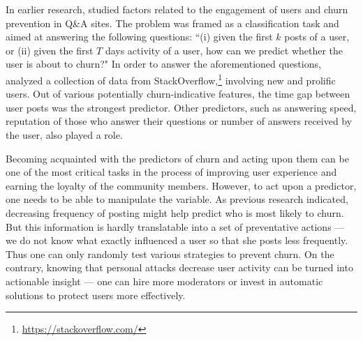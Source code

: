 \documentclass[a4paper,fleqn]{cas-dc}
\begin{document}
In earlier research, \citet{pudipeddi2014user} studied factors related to the engagement of users and churn prevention in Q\&A sites.
The problem was framed as a classification task and aimed at answering the following questions: ``(i) given the first $k$ posts of a user, or (ii) given the first $T$ days activity of a user, how can we predict whether the user is about to churn?" In order to answer the aforementioned questions,
\citet{pudipeddi2014user} analyzed a collection of data from StackOverflow,\footnote{\url{https://stackoverflow.com/}}  involving 
new  and prolific users. 
Out of various potentially churn-indicative features, the time gap between user posts was the strongest predictor.  Other predictors, such as  answering speed, reputation of those who answer their questions or number of answers received by the user, also played a role.

Becoming acquainted with the predictors of churn and acting upon them can be one of the most critical tasks in the process of improving user experience and earning the loyalty of the community members. 
However, to act upon a predictor, one needs to be able to manipulate  the variable. 
As previous research indicated, decreasing frequency of posting might help predict who is most likely to churn. But this information is hardly translatable into a set of preventative actions --- we do not know what exactly influenced a user so that she posts less frequently. Thus one can only randomly test various strategies to prevent churn. On the contrary, knowing that personal attacks decrease user activity can be turned into actionable insight ---  one can hire more moderators or invest in automatic solutions to protect users more effectively.
\end{document}
